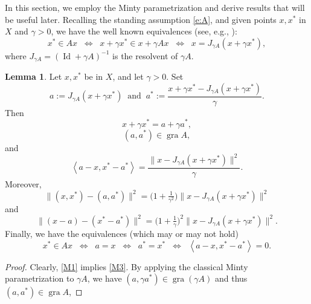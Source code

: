 \documentclass[12pt]{article}
\newcommand{\scal}[2]{\left\langle{#1},{#2}  \right\rangle}
\newcommand{\Id}{\ensuremath{\operatorname{Id}}}
\theoremstyle{definition}
\newtheorem{lemma}[theorem]{Lemma}
\providecommand{\gr}{\operatorname{gra}}
\providecommand{\Id}{\operatorname{{ Id}}}
\providecommand{\gr}{\operatorname{gra}}
\providecommand{\Id}{\operatorname{Id}}
\begin{document}
{\label{sec:Minty}

In this section, we employ the Minty parametrization and derive 
results that will be useful later. 
Recalling the standing assumption \cref{e:A}, and given 
points $x,x^*$ in $X$ and $\gamma>0$, we have the
well known equivalences (see, e.g., \cite[Chapter~23]{BC2017}): 
\begin{equation}
\label{e:basic}
x^*\in Ax
\;\;\Leftrightarrow\;\;
x+\gamma x^* \in x+\gamma Ax
\;\;\Leftrightarrow\;\;
x = J_{\gamma A}(x+\gamma x^*),
\end{equation}
where $J_{\gamma A}=(\Id+\gamma A)^{-1}$ is the resolvent of $\gamma A$. 

\begin{lemma}
\label{l:Minty}
Let $x,x^*$ be in $X$, and let $\gamma>0$. 
Set 
\begin{equation}
\label{M1}
a := J_{\gamma A}(x+\gamma x^*)
\;\;\text{and}\;\;
a^* := \frac{x+\gamma x^*-J_{\gamma A}(x+\gamma x^*)}{\gamma}.
\end{equation}
Then 
\begin{equation}
\label{M3}
x+\gamma x^* = a+\gamma a^*, 
\end{equation}
\begin{equation}
\label{M2}
(a,a^*)\in\gr A,
\end{equation}
and 
\begin{equation}
\label{e:key1}
\scal{a-x}{x^*-a^*} = \frac{\|x-J_{\gamma A}(x+\gamma x^*)\|^2}{\gamma}. 
\end{equation}
Moreover, 
\begin{equation}
\label{M6}
\|(x,x^*)-(a,a^*)\|^2 = \big(1+\tfrac{1}{\gamma^{2}}\big)\|x-J_{\gamma A}(x+\gamma x^*)\|^2 
\end{equation}
and 
\begin{equation}
\label{M8}
\big\|(x-a)-(x^*-a^*)\big\|^2 = \big( 1+ \tfrac{1}{\gamma}\big)^2\|x-J_{\gamma A}(x+\gamma x^*)\|^2. 
\end{equation}
Finally, we have the equivalences (which may or may not hold)
\begin{equation}
\label{e:key1=0}
x^*\in Ax
\;\;\Leftrightarrow\;\;
a=x
\;\;\Leftrightarrow\;\;
a^*=x^*
\;\;\Leftrightarrow\;\;
\scal{a-x}{x^*-a^*} = 0. 
\end{equation}
\end{lemma}
\begin{proof}
Clearly, \cref{M1} implies \cref{M3}. 
By applying the classical Minty parametrization to $\gamma A$, 
we have $(a,\gamma a^*)\in\gr(\gamma A)$ and thus $(a,a^*)\in \gr A$, 

\end{proof}}
\end{document}
